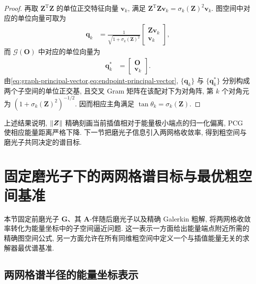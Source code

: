 \documentclass{ctexart}
\newcommand{\T}{\mathrm{T}}
\DeclarePairedDelimiter\norm{\lVert}{\rVert}
\begin{document}
\begin{proof}
再取 $\bm Z^\T\bm Z$ 的单位正交特征向量 $\bm v_k$, 满足 $\bm Z^\T\bm Z\bm v_k=\sigma_k(\bm Z)^2\bm v_k$. 图空间中对应的单位向量可取为
\begin{align}
    \bm q_k
    &=\frac{1}{\sqrt{1+\sigma_k(\bm Z)^2}}
      \begin{bmatrix}\bm Z\bm v_k\\\bm v_k\end{bmatrix},
    \label{eq:graph-principal-vector}
\end{align}
而 $\mathcal G(\mathbf O)$ 中对应的单位向量为
\begin{align}
    \bm q_k^\ast&=\begin{bmatrix}\mathbf O\\\bm v_k\end{bmatrix}.
    \label{eq:endpoint-principal-vector}
\end{align}
由\cref{eq:graph-principal-vector,eq:endpoint-principal-vector}, $\{\bm q_k\}$ 与 $\{\bm q_k^\ast\}$ 分别构成两个子空间的单位正交基, 且交叉 Gram 矩阵在该配对下为对角阵, 第 $k$ 个对角元为 $(1+\sigma_k(\bm Z)^2)^{-1/2}$. 因而相应主角满足 $\tan\theta_k=\sigma_k(\bm Z)$.
\end{proof}


上述结果说明, $\norm{\bm Z}$ 精确刻画当前插值相对于能量极小端点的归一化偏离, PCG 使相应能量距离严格下降. 下一节把磨光子信息引入两网格收敛率, 得到粗空间与磨光子共同决定的谱目标.

\section{固定磨光子下的两网格谱目标与最优粗空间基准}
\label{sec:tg-objective}

本节固定前磨光子 $\bm G$、其 $\bm A$-伴随后磨光子以及精确 Galerkin 粗解, 将两网格收敛率转化为能量坐标中的子空间逼近问题. 这一表示一方面给出能量端点附近所需的精确图空间公式, 另一方面允许在所有同维粗空间中定义一个与插值能量无关的求解器最优谱基准.

\subsection{两网格谱半径的能量坐标表示}
\label{subsec:energy-coordinate-tg}
\end{document}

